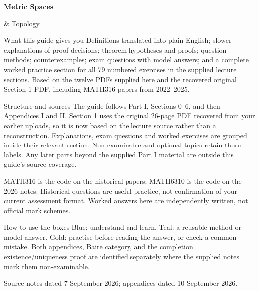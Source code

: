 \documentclass[12pt]{article}
\begin{document}
\begin{titlepage}
\vspace*{18mm}
{\Huge\bfseries\color{navy} Metric Spaces\par\& Topology\par}
\vspace{8mm}{\Large MATH6310\par Expanded lecture notes, proofs and worked exercises\par}
\vspace{5mm}{\large Prepared for Sai Vanam}
\vspace{10mm}
\begin{note}{What this guide gives you}
Definitions translated into plain English; slower explanations of proof decisions; theorem hypotheses and proofs; question methods; counterexamples; exam questions with model answers; and a complete worked practice section for all 79 numbered exercises in the supplied lecture sections. Based on the twelve PDFs supplied here and the recovered original Section 1 PDF, including MATH316 papers from 2022--2025.
\end{note}
\begin{note}{Structure and sources}
The guide follows Part I, Sections 0--6, and then Appendices I and II. Section 1 uses the original 26-page PDF recovered from your earlier uploads, so it is now based on the lecture source rather than a reconstruction. Explanations, exam questions and worked exercises are grouped inside their relevant section. Non-examinable and optional topics retain those labels. Any later parts beyond the supplied Part I material are outside this guide's source coverage.

MATH316 is the code on the historical papers; MATH6310 is the code on the 2026 notes. Historical questions are useful practice, not confirmation of your current assessment format. Worked answers here are independently written, not official mark schemes.
\end{note}
\begin{note}{How to use the boxes}
Blue: understand and learn. Teal: a reusable method or model answer. Gold: practise before reading the answer, or check a common mistake. Both appendices, Baire category, and the completion existence/uniqueness proof are identified separately where the supplied notes mark them non-examinable.
\end{note}
\vfill{\small Source notes dated 7 September 2026; appendices dated 10 September 2026.}
\end{titlepage}
\tableofcontents\clearpage








\appendix
\renewcommand{\thesection}{\Roman{section}}
\titleformat{\section}{\Large\bfseries}{Appendix \thesection}{1em}{}
\renewcommand{\thesubsection}{\Roman{section}.\arabic{subsection}}


\end{document}
